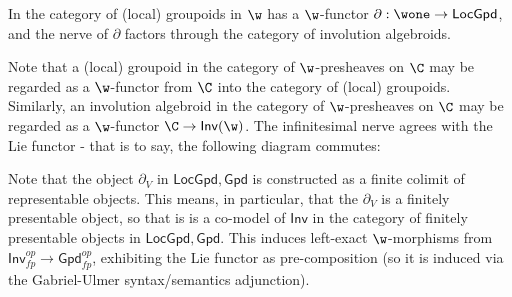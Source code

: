 \begin{theorem}
    In the category of (local) groupoids in $\w$ has a $\w$-functor $\partial: \wone \to \mathsf{LocGpd}$, and the nerve of $\partial$ factors through the category of involution algebroids.
    \[\]
\end{theorem}
\begin{corollary}
    Note that a (local) groupoid in the category of $\w$-presheaves on $\C$ may be regarded as a $\w$-functor from $\C$ into the category of (local) groupoids. Similarly, an involution algebroid in the category of $\w$-presheaves on $\C$ may be regarded as a $\w$-functor $\C \to \mathsf{Inv}(\w)$.
    The infinitesimal nerve agrees with the Lie functor - that is to say, the following diagram commutes:
    \[\]
\end{corollary}

\begin{observation}
    Note that the object $\partial_V$ in $\mathsf{LocGpd, Gpd}$ is constructed as a finite colimit of representable objects.
    This means, in particular, that the $\partial_V$ is a finitely presentable object, so that is is a co-model of $\mathsf{Inv}$ in the category of finitely presentable objects in $\mathsf{LocGpd, Gpd}$.
    This induces left-exact $\w$-morphisms from $\mathsf{Inv}_{fp}^{op} \to \mathsf{Gpd}_{fp}^{op}$, exhibiting the Lie functor as pre-composition (so it is induced via the Gabriel-Ulmer syntax/semantics adjunction).
\end{observation}

    






